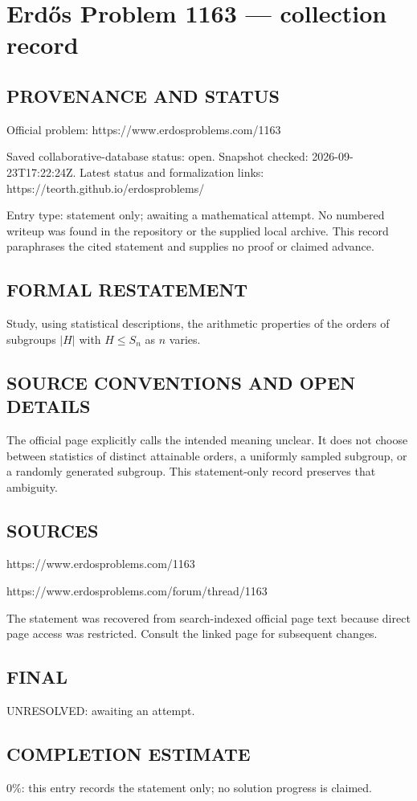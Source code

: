 \section*{Erd\H{o}s Problem 1163 --- collection record}

\subsection*{PROVENANCE AND STATUS}
Official problem: https://www.erdosproblems.com/1163

Saved collaborative-database status: open.
Snapshot checked: 2026-09-23T17:22:24Z.
Latest status and formalization links: https://teorth.github.io/erdosproblems/

Entry type: statement only; awaiting a mathematical attempt. No numbered writeup was found in the repository or the supplied local archive. This record paraphrases the cited statement and supplies no proof or claimed advance.

\subsection*{FORMAL RESTATEMENT}
Study, using statistical descriptions, the arithmetic properties of the orders of subgroups $|H|$ with $H\leq S_n$ as $n$ varies.

\subsection*{SOURCE CONVENTIONS AND OPEN DETAILS}
The official page explicitly calls the intended meaning unclear. It does not choose between statistics of distinct attainable orders, a uniformly sampled subgroup, or a randomly generated subgroup. This statement-only record preserves that ambiguity.

\subsection*{SOURCES}
https://www.erdosproblems.com/1163

https://www.erdosproblems.com/forum/thread/1163

The statement was recovered from search-indexed official page text because direct page access was restricted. Consult the linked page for subsequent changes.

\subsection*{FINAL}
UNRESOLVED: awaiting an attempt.

\subsection*{COMPLETION ESTIMATE}
$0\%$: this entry records the statement only; no solution progress is claimed.
